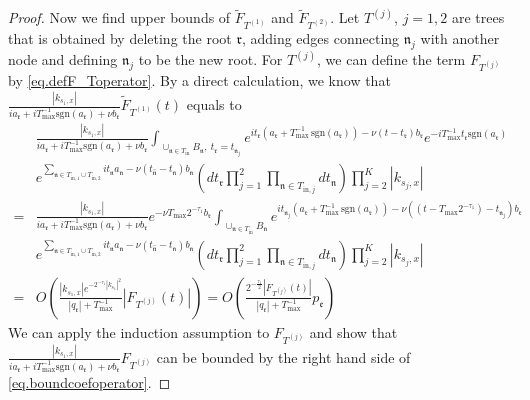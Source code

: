 \begin{proof}
Now we find upper bounds of $\widetilde{F}_{T^{(1)}}$ and $\widetilde{F}_{T^{(2)}}$. Let $T^{(j)}$, $j=1,2$ are trees that is obtained by deleting the root $\mathfrak{r}$, adding edges connecting $\mathfrak{n}_j$ with another node and defining $\mathfrak{n}_j$ to be the new root. For $T^{(j)}$, we can define the term $F_{T^{(j)}}$ by \eqref{eq.defF_Toperator}. By a direct calculation, we know that $\frac{|k_{s_1,x}|}{ia_{\mathfrak{r}}+iT^{-1}_{\text{max}} \text{sgn}(a_{\mathfrak{r}})+\nu b_{\mathfrak{r}} }\widetilde{F}_{T^{(1)}}(t)$ equals to
\begin{equation}
    \begin{split}
        &\frac{|k_{s_1,x}|}{ia_{\mathfrak{r}}+iT^{-1}_{\text{max}} \text{sgn}(a_{\mathfrak{r}})+\nu b_{\mathfrak{r}} } \int_{\cup_{\mathfrak{n}\in T_{\text{in}}} B_{\mathfrak{n}},\ t_{\mathfrak{r}}=t_{\mathfrak{n}_j}} e^{it_{\mathfrak{r}}(a_{\mathfrak{r}}+T^{-1}_{\text{max}}\, \text{sgn}(a_{\mathfrak{r}}))- \nu(t-t_{\mathfrak{r}})b_{\mathfrak{r}}} e^{-iT^{-1}_{\text{max}}t_{\mathfrak{r}} \text{sgn}(a_{\mathfrak{r}})} 
        \\
        &e^{\sum_{\mathfrak{n}\in T_{\text{in},1}\cup T_{\text{in},2}} it_{\mathfrak{n}} a_{\mathfrak{n}} - \nu(t_{\widehat{\mathfrak{n}}}-t_{\mathfrak{n}})b_{\mathfrak{n}}} \left(dt_{\mathfrak{r}}\prod_{j=1}^2\prod_{\mathfrak{n}\in T_{\text{in},j}}dt_{\mathfrak{n}}  \right)\prod^K_{j=2}|k_{s_j,x}|
        \\
        =&\frac{|k_{s_1,x}|}{ia_{\mathfrak{r}}+iT^{-1}_{\text{max}} \text{sgn}(a_{\mathfrak{r}})+\nu b_{\mathfrak{r}} }  e^{- \nu T_{\text{max}} 2^{-\tau_{1}}b_{\mathfrak{r}}}\int_{\cup_{\mathfrak{n}\in T_{\text{in}}} B_{\mathfrak{n}}} e^{it_{\mathfrak{n}_j}(a_{\mathfrak{r}}+T^{-1}_{\text{max}}\, \text{sgn}(a_{\mathfrak{r}}))- \nu((t-T_{\text{max}} 2^{-\tau_{1}})-t_{\mathfrak{n}_j})b_{\mathfrak{r}}}
        \\
        &  e^{\sum_{\mathfrak{n}\in T_{\text{in},1}\cup T_{\text{in},2}} it_{\mathfrak{n}} a_{\mathfrak{n}} - \nu(t_{\widehat{\mathfrak{n}}}-t_{\mathfrak{n}})b_{\mathfrak{n}}}\left(dt_{\mathfrak{r}}\prod_{j=1}^2\prod_{\mathfrak{n}\in T_{\text{in},j}}dt_{\mathfrak{n}}  \right)\prod^K_{j=2}|k_{s_j,x}|
        \\
        =&O\left(\frac{|k_{s_1,x}|e^{- 2^{-\tau_{1}}|k_{s_1}|^2} }{|q_{\mathfrak{r}}|+T^{-1}_{\text{max}}} |F_{T^{(j)}}(t)|\right)=O\left(\frac{2^{-\frac{\tau_{1}}{2}}|F_{T^{(j)}}(t)| }{|q_{\mathfrak{r}}|+T^{-1}_{\text{max}}}p_{\mathfrak{e}}\right)
    \end{split}
\end{equation}
We can apply the induction assumption to $F_{T^{(j)}}$ and show that $\frac{|k_{s_1,x}|}{ia_{\mathfrak{r}}+iT^{-1}_{\text{max}} \text{sgn}(a_{\mathfrak{r}})+\nu b_{\mathfrak{r}} } F_{T^{(j)}}$ can be bounded by the right hand side of \eqref{eq.boundcoefoperator}.



\end{proof}
